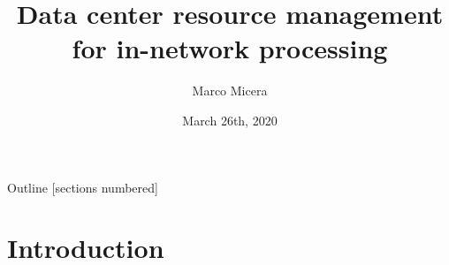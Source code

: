 

\title{Data center resource management for in-network processing}
\date{March 26th, 2020} %
\author{Marco Micera}



\maketitle

\begin{frame}{Outline}
  [sections numbered]
  \tableofcontents[hideallsubsections]
\end{frame}

\section{Introduction}

